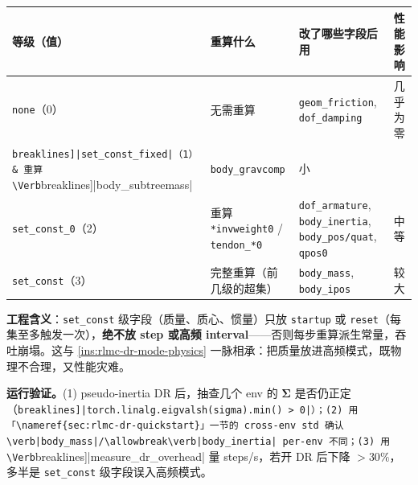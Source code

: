 \begin{center}
\small
\begin{tabular}{@{}lp{3.6cm}p{3.8cm}l@{}}
\toprule
等级（值） & 重算什么 & 改了哪些字段后用 & 性能影响 \\
\midrule
\verb|none|（0） & 无需重算 & \verb|geom_friction|, \verb|dof_damping| & 几乎为零 \\
\Verb[breaklines]|set_const_fixed|（1） & 重算 \Verb[breaklines]|body_subtreemass| & \verb|body_gravcomp| & 小 \\
\verb|set_const_0|（2） & 重算 \verb|*invweight0| / \verb|tendon_*0| & \verb|dof_armature|, \verb|body_inertia|, \verb|body_pos/quat|, \verb|qpos0| & 中等 \\
\verb|set_const|（3） & 完整重算（前几级的超集） & \verb|body_mass|, \verb|body_ipos| & 较大 \\
\bottomrule
\end{tabular}
\end{center}

\textbf{工程含义}：\verb|set_const| 级字段（质量、质心、惯量）只放 \verb|startup| 或 \verb|reset|（每集至多触发一次），\textbf{绝不放 step 或高频 interval}——否则每步重算派生常量，吞吐崩塌。这与 \cref{ins:rlmc-dr-mode-physics} 一脉相承：把质量放进高频模式，既物理不合理，又性能灾难。

\textbf{运行验证。}(1) pseudo-inertia DR 后，抽查几个 env 的 $\boldsymbol\Sigma$ 是否仍正定（\Verb[breaklines]|torch.linalg.eigvalsh(sigma).min() > 0|）；(2) 用「\nameref{sec:rlmc-dr-quickstart}」一节的 cross-env std 确认 \verb|body_mass|/\allowbreak\verb|body_inertia| per-env 不同；(3) 用 \Verb[breaklines]|measure_dr_overhead| 量 steps/s，若开 DR 后下降 $>30\%$，多半是 \verb|set_const| 级字段误入高频模式。


